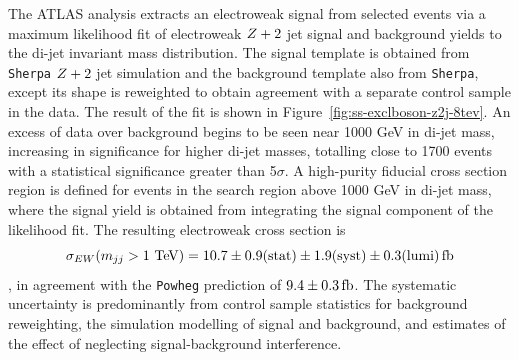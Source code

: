 The ATLAS analysis extracts an electroweak signal from selected events via a maximum likelihood fit
of electroweak $Z+2$ jet signal and background yields to the di-jet invariant mass distribution.
The signal template is obtained from \texttt{Sherpa} $Z+2$ jet simulation and the background template also from \texttt{Sherpa},
except its shape is reweighted to obtain agreement with a separate control sample in the data.
The result of the fit is shown in Figure~\ref{fig:ss-exclboson-z2j-8tev}.  An excess of data over background begins to be seen
near 1000 GeV in di-jet mass, increasing in significance for higher di-jet masses, totalling close to 1700 events with a statistical
significance greater than 5$\sigma$.   A high-purity fiducial cross section region is defined for events in the search
region above 1000 GeV in di-jet mass, where the signal yield is obtained from integrating the signal component of the likelihood fit.
The resulting electroweak cross section is
$$\sigma_{EW} (m_{jj} > 1 \TeV) = 10.7 \pm 0.9 \rm{(stat)} \pm 1.9 \rm{(syst)} \pm 0.3 \rm{(lumi)} \rm{\,fb}$$,
in agreement with the \texttt{Powheg} prediction of $9.4\pm0.3 \rm{\,fb}$.  The systematic uncertainty is predominantly from
control sample statistics for background reweighting, the simulation modelling of signal and background,
and estimates of the effect of neglecting signal-background interference.

